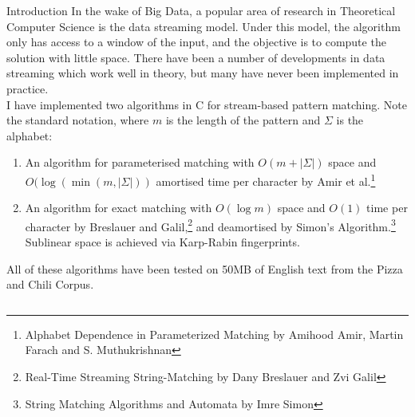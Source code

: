 \documentclass[ %
                    author={Dominic Moylett},
                supervisor={Dr. Raphael Clifford, Dr. Markus Jalsenius and Dr. Benjamin Sach},
                     title={An Empirical Analysis of Data Streaming Algorithms},
                  subtitle={},
                    degree={MEng},
                      year={2014} ]{poster}
\begin{document}

\begin{frame}{} 

\vfill

\begin{columns}[t]
  \begin{column}{0.900\linewidth}
  \begin{block}{\Large Introduction}
  In the wake of Big Data, a popular area of research in Theoretical Computer Science is the data streaming model. Under this model, the algorithm only has access to a window of the input, and the objective is to compute the solution with little space. There have been a number of developments in data streaming which work well in theory, but many have never been implemented in practice.\\
  \vspace{\baselineskip}
  I have implemented two algorithms in C for stream-based pattern matching. Note the standard notation, where $m$ is the length of the pattern and $\Sigma$ is the alphabet:
  \begin{enumerate}
  \item An algorithm for parameterised matching with $O(m + \left|\Sigma\right|)$ space and $O(\log(\min(m, \left|\Sigma\right|))$ amortised time per character by Amir et al.\footnote{Alphabet Dependence in Parameterized Matching by Amihood Amir, Martin Farach and S. Muthukrishnan}
  \item An algorithm for exact matching with $O(\log m)$ space and $O(1)$ time per character by Breslauer and Galil,\footnote{Real-Time Streaming String-Matching by Dany Breslauer and Zvi Galil} and deamortised by Simon's Algorithm.\footnote{String Matching Algorithms and Automata by Imre Simon} Sublinear space is achieved via Karp-Rabin fingerprints.
  \end{enumerate}

  \noindent
  All of these algorithms have been tested on 50MB of English text from the Pizza and Chili Corpus.
  \end{block}
  \end{column}
\end{columns}

\vfill


\end{frame}
\end{document}
